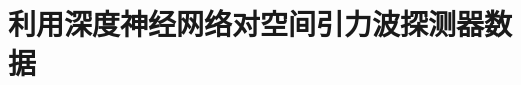 \chapter{利用深度神经网络对空间引力波探测器数据}
\label{chap:deep learning for space-based gravitational wave detector data}